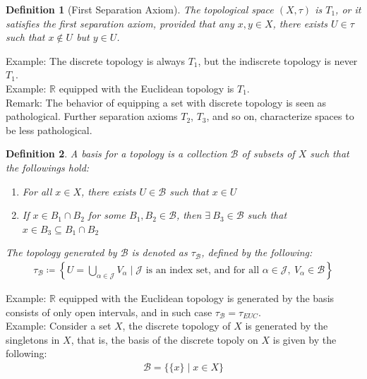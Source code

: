 \documentclass[11pt]{book}
\theoremstyle{break}
\theoremstyle{break}
\newtheorem{defn}{Definition}[corL]
\newcommand{\R}{\mathbb{R}}
\newcommand{\remark}{\color{blue}Remark: \color{black}}
\newcommand{\example}{\color{green}Example: \color{black}}
\begin{document}
\begin{defn}[First Separation Axiom]
The topological space $(X,\tau)$ is $T_1$, or it satisfies the first separation axiom, provided that any $x,y \in X$, there exists $U \in \tau$ such that $x \notin U$ but $y \in U$. 
\end{defn}


\example The discrete topology is always $T_1$, but the indiscrete topology is never $T_1$. \\

\example $\R$ equipped with the Euclidean topology is $T_1$. \\

\remark The behavior of equipping a set with discrete topology is seen as pathological.
Further separation axioms $T_2$, $T_3$, and so on, characterize spaces to be less pathological.\\

\begin{defn}
A basis for a topology is a collection $\mathcal{B}$ of subsets of $X$ such that the followings hold:
\begin{enumerate}[topsep=3pt,itemsep=-1ex,partopsep=1ex,parsep=1ex]
\item For all $x \in X$, there exists $U \in \mathcal{B}$ such that $x \in U$
\item If $x \in B_1 \cap B_2$ for some $B_1,B_2 \in \mathcal{B}$, then $\exists\ B_3 \in \mathcal{B}$ such that $x \in B_3 \subseteq B_1 \cap B_2$
\end{enumerate}
The topology generated by $\mathcal{B}$ is denoted as $\tau_\mathcal{B}$, defined by the following:
\begin{align*}
\tau_{\mathcal{B}} \coloneqq \left\{U = \bigcup_{\alpha\in \mathcal{J}}V_\alpha \mid \mathcal{J} \text{ is an index set, and for all }\alpha \in \mathcal{J},\ V_{\alpha} \in\mathcal{B}\right\}
\end{align*}
\end{defn}

\example $\R$ equipped with the Euclidean topology is generated by the basis consists of only open intervals, and in such case $\tau_{\mathcal{B}} = \tau_{EUC}$.\\


\example Consider a set $X$, the discrete topology of $X$ is generated by the singletons in $X$, that is, the basis of the discrete topoly on $X$ is given by the following: 
\begin{align*}
\mathcal{B} = \{ \{x\} \mid x \in X\}
\end{align*}
\end{document}
